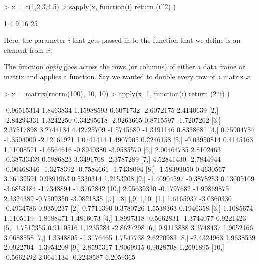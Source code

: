 \documentclass{article}
\begin{document}
\begin{Schunk}
\begin{Sinput}
> x = c(1,2,3,4,5)
> sapply(x, function(i) { return (i^2) } )
\end{Sinput}
\begin{Soutput}
[1]  1  4  9 16 25
\end{Soutput}
\end{Schunk}

Here, the parameter \textit{i} that gets passed in to the function that we
define is an element from $x$.

The function \textit{apply} goes across the rows (or columns) of either a
data frame or matrix and applies a function.  Say we wanted to double
every row of a matrix $x$

\begin{Schunk}
\begin{Sinput}
> x = matrix(rnorm(100), 10, 10)
> apply(x, 1, function(i) { return (2*i) } )
\end{Sinput}
\begin{Soutput}
             [,1]       [,2]        [,3]       [,4]       [,5]       [,6]
 [1,] -0.96515314  1.8463834  1.15988593  0.6071732 -2.6072175  2.4140639
 [2,] -2.84294331  1.3242250  0.34295618 -2.9263665  0.8715597 -1.7207262
 [3,]  2.37517898  3.2744134  4.42725709 -1.5745680 -1.3191146  0.8338681
 [4,]  0.75904754 -1.3504000 -2.12161921  1.0741414  1.4907905  0.2246158
 [5,] -0.03950814  0.4145163  1.11008521 -1.6564616 -0.8940380 -3.9585570
 [6,]  2.00464785  2.8102463 -0.38733439  0.5886823  3.3491708 -2.3787289
 [7,]  4.52841430 -2.7844944 -0.00468346 -1.3278392 -0.7584661 -1.7438094
 [8,] -1.58393050  0.4630567  3.76139591  0.9891963  0.5330314  1.2153208
 [9,] -1.40904597 -0.3878253  0.13005109 -3.6853184 -1.7348894 -1.3762842
[10,]  2.95639330 -0.1797682 -1.99869875  2.3324389 -0.7509350 -3.0821835
            [,7]       [,8]       [,9]      [,10]
 [1,]  1.6165937 -3.0360330 -0.4934786  0.9350237
 [2,]  0.7711390  0.3780726  1.5538363  0.1946358
 [3,]  1.1085674  1.1105119 -1.8188471  1.4816073
 [4,]  1.8997318 -0.5662831 -1.3744077  0.9221423
 [5,]  1.7512355  0.9110516  1.1235284 -2.8627298
 [6,]  0.9113888  3.3748437  1.9052166  3.0688558
 [7,]  1.3348805 -1.3176465  1.7547738  2.6220983
 [8,] -2.4324963  1.9638539  2.0922704 -1.3954208
 [9,]  2.8595317  1.9069915  0.9028708  1.2691895
[10,] -0.5662492  2.0641134 -0.2248587  6.2059365
\end{Soutput}
\end{Schunk}
\end{document}
